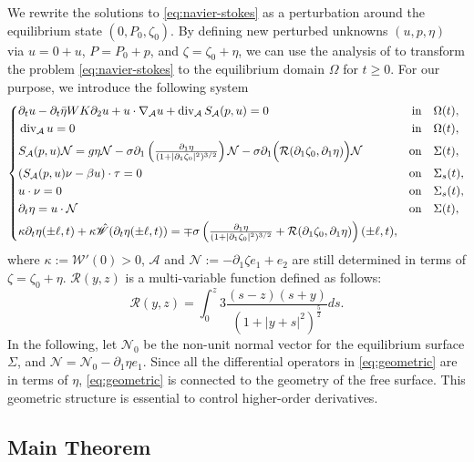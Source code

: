 \documentclass[letterpaper,reqno,10pt,twoside]{amsart}
\theoremstyle{definition}
\theoremstyle{remark}
\def\p{\partial}
\def\Om{\Omega}
\def\dive{\mathop{\rm div}\nolimits}
\begin{document}
	We rewrite the solutions to \eqref{eq:navier-stokes} as a perturbation around the equilibrium state $(0, P_0, \zeta_0)$. By  defining new perturbed unknowns $(u, p, \eta)$ via $u=0+u$, $P=P_0+p$, and $\zeta=\zeta_0+\eta$, we can  use the analysis of \cite{GT2020} to transform the problem \eqref{eq:navier-stokes} to the equilibrium domain $\Om$ for $t\ge0$. For our purpose, we introduce the following  system
	\begin{equation}\label{eq:geometric}
		\left\{
		\begin{aligned}
			&\p_tu-\p_t\bar{\eta}WK\p_2u+u\cdot\nabla_{\mathcal{A}}u+\dive_{\mathcal{A}}S_{\mathcal{A}}(p,u)=0 \quad &\text{in}&\quad \Om(t),\\
			&\dive_{\mathcal{A}}u=0 \quad &\text{in}&\quad \Om(t),\\
			&S_{\mathcal{A}}(p,u)\mathcal{N}=g\eta\mathcal{N}-\sigma\p_1\left(\tfrac{\p_1\eta }{(1+|\p_1\zeta_0|^2)^{3/2}}\right)\mathcal{N}-\sigma\p_1\Big(\mathcal{R}(\p_1\zeta_0,\p_1\eta)\Big)\mathcal{N} \quad &\text{on}&\quad\Sigma(t),\\
			&(S_{\mathcal{A}}(p,u)\nu-\beta u)\cdot\tau=0 \quad &\text{on}&\quad\Sigma_s(t),\\
			&u\cdot\nu=0 \quad &\text{on}&\quad\Sigma_s(t),\\
			&\p_t\eta=u\cdot\mathcal{N} \quad &\text{on}&\quad\Sigma(t),\\
			&\kappa\p_t\eta(\pm\ell,t)+\kappa\hat{\mathscr{W}}(\p_t\eta(\pm\ell,t))=\mp\sigma\left(\tfrac{\p_1\eta}{(1+|\p_1\zeta_0|^2)^{3/2}}+\mathcal{R}(\p_1\zeta_0,\p_1\eta)\right)(\pm\ell,t),
		\end{aligned}
		\right.
	\end{equation}
	where $\kappa:=\mathscr{W}'(0)>0$, $\mathcal{A}$ and $\mathcal{N}:=-\p_1\zeta e_1+e_2$ are still determined in terms of $\zeta=\zeta_0+\eta$. $\mathcal{R}(y,z)$ is a multi-variable function defined as follows:
	\[
	\mathcal{R}(y,z)=\int_{0}^{z}3\frac{(s-z)(s+y)}{(1+|y+s|^{2})^{\frac{5}{2}}}ds.
	\]
	In the following, let $\mathcal{N}_0$ be the non-unit normal vector for the equilibrium surface $\Sigma$, and $\mathcal{N}=\mathcal{N}_0-\p_1\eta e_1$.
	Since all the differential operators in \eqref{eq:geometric} are in terms of $\eta$, \eqref{eq:geometric} is connected to the geometry of the free surface. This geometric structure is essential to control higher-order derivatives. 
	
	
	\subsection{Main Theorem}
	
\end{document}
